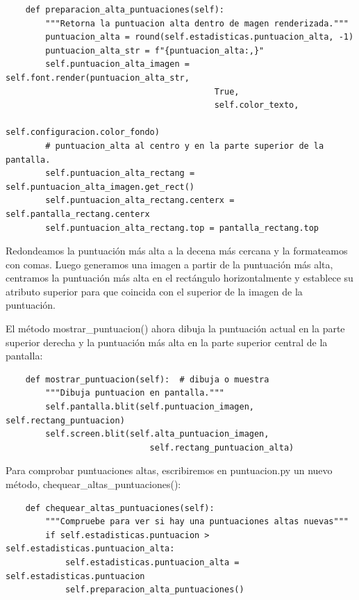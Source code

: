 	  
\hspace{-2.9cm}{\ttfamily \scriptsize puntuacion.py}  \vspace{-0.5cm}
\begin{lstlisting}		
    def preparacion_alta_puntuaciones(self):
        """Retorna la puntuacion alta dentro de magen renderizada."""
        puntuacion_alta = round(self.estadisticas.puntuacion_alta, -1)
        puntuacion_alta_str = f"{puntuacion_alta:,}"
        self.puntuacion_alta_imagen = self.font.render(puntuacion_alta_str,
                                          True,
                                          self.color_texto,
                                          self.configuracion.color_fondo)
        # puntuacion_alta al centro y en la parte superior de la pantalla.
        self.puntuacion_alta_rectang = self.puntuacion_alta_imagen.get_rect()
        self.puntuacion_alta_rectang.centerx = self.pantalla_rectang.centerx
        self.puntuacion_alta_rectang.top = pantalla_rectang.top
\end{lstlisting}

Redondeamos la puntuación más alta a la decena más cercana y la formateamos con comas.
Luego generamos una imagen a partir de la puntuación más alta, centramos la
puntuación más alta en el rectángulo  horizontalmente y establece su atributo superior para que coincida con el superior
de la imagen de la puntuación.

El método {\ttfamily mostrar\_puntuacion()} ahora dibuja la puntuación actual en la parte superior derecha
y la puntuación más alta en la parte superior central de la pantalla:

\hspace{-2.9cm}{\ttfamily \scriptsize puntuacion.py}  \vspace{-0.5cm}
\begin{lstlisting}		
    def mostrar_puntuacion(self):  # dibuja o muestra
        """Dibuja puntuacion en pantalla."""
        self.pantalla.blit(self.puntuacion_imagen, self.rectang_puntuacion)
        self.screen.blit(self.alta_puntuacion_imagen, 
                             self.rectang_puntuacion_alta)
\end{lstlisting}
Para comprobar puntuaciones altas, escribiremos en {\ttfamily puntuacion.py} un nuevo método, {\ttfamily chequear\_altas\_puntuaciones()}:  %

\hspace{-2.9cm}{\ttfamily \scriptsize puntuacion.py}  \vspace{-0.5cm}
\begin{lstlisting}	
    def chequear_altas_puntuaciones(self):
        """Compruebe para ver si hay una puntuaciones altas nuevas"""
        if self.estadisticas.puntuacion > self.estadisticas.puntuacion_alta:
            self.estadisticas.puntuacion_alta = self.estadisticas.puntuacion	
            self.preparacion_alta_puntuaciones()
\end{lstlisting}




